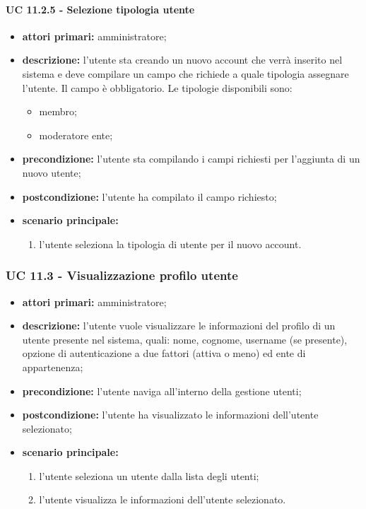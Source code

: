 			\paragraph{UC 11.2.5 - Selezione tipologia utente}
			\begin{itemize}
				\item \textbf{attori primari:} amministratore;
				\item \textbf{descrizione:} l'utente sta creando un nuovo account che verrà inserito nel sistema e deve compilare un campo che richiede a quale tipologia assegnare l'utente. Il campo è obbligatorio. Le tipologie disponibili sono:
				\begin{itemize}
					\item membro;
					\item moderatore ente;
				\end{itemize}
				\item \textbf{precondizione:} l'utente sta compilando i campi richiesti per l'aggiunta di un nuovo utente;
				\item \textbf{postcondizione:} l'utente ha compilato il campo richiesto;
				\item \textbf{scenario principale:}
				\begin{enumerate}
					\item{l'utente seleziona la tipologia di utente per il nuovo account.}
				\end{enumerate}
			\end{itemize}

			\subsubsection{UC 11.3 - Visualizzazione profilo utente}
			\begin{itemize}
				\item \textbf{attori primari:} amministratore;
				\item \textbf{descrizione:} l'utente vuole visualizzare le informazioni del profilo di un utente presente nel sistema, quali: nome, cognome, username  (se presente), opzione di autenticazione a due fattori (attiva o meno) ed ente di appartenenza;
				\item \textbf{precondizione:} l'utente naviga all'interno della gestione utenti;
				\item \textbf{postcondizione:} l'utente ha visualizzato le informazioni dell'utente selezionato;
				\item \textbf{scenario principale:}
				\begin{enumerate}
					\item{l'utente seleziona un utente dalla lista degli utenti;}
					\item{l'utente visualizza le informazioni dell'utente selezionato.}
				\end{enumerate}
			\end{itemize}


